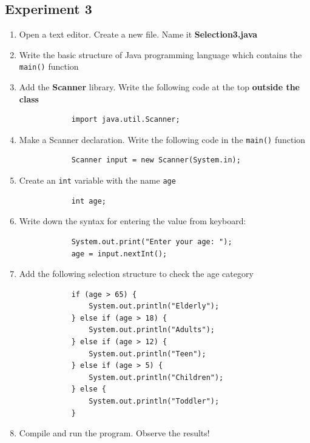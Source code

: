 \documentclass[12pt,titlepage]{article}
\begin{document}
\subsection{Experiment 3}
\begin{enumerate}
    \item Open a text editor. Create a new file. Name it \textbf{Selection3.java}
    \item Write the basic structure of Java programming language which contains the \texttt{main()} function
    \item {
        Add the \textbf{Scanner} library. Write the following code at the top \textbf{outside the class}

        \begin{verbatim}
            import java.util.Scanner;
        \end{verbatim}
    }
    \item {
        Make a Scanner declaration. Write the following code in the \texttt{main()} function

        \begin{verbatim}
            Scanner input = new Scanner(System.in);
        \end{verbatim}
    }
    \pagebreak
    \item {
        Create an \texttt{int} variable with the name \texttt{age}

        \begin{verbatim}
            int age;
        \end{verbatim}
    }
    \item {
        Write down the syntax for entering the value from keyboard:

        \begin{verbatim}
            System.out.print("Enter your age: ");
            age = input.nextInt();
        \end{verbatim}
    }
    \item {
        Add the following selection structure to check the age category

        \begin{verbatim}
            if (age > 65) {
                System.out.println("Elderly");
            } else if (age > 18) {
                System.out.println("Adults");
            } else if (age > 12) {
                System.out.println("Teen");
            } else if (age > 5) {
                System.out.println("Children");
            } else {
                System.out.println("Toddler");
            }
        \end{verbatim}
    }
    \pagebreak
    \item {
        Compile and run the program. Observe the results!

}
\end{enumerate}
\end{document}
